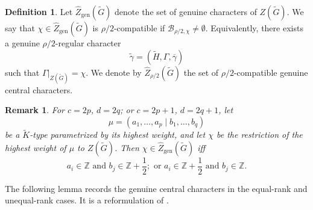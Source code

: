 \documentclass{amsart}
\newcommand{\bbZ}{{\mathbb Z}}
\newtheorem{remark}[thm]{Remark}
\theoremstyle{definition}
\newtheorem{definition}[thm]{Definition}
\newcommand{\tu}{\widetilde}
\begin{document}
\begin{definition}
Let $\widehat Z_{\mathrm{gen}}(\widetilde G)$ denote the set of genuine characters of $Z(\widetilde G)$. We say that $\chi\in \widehat Z_{\mathrm{gen}}(\widetilde G)$ is $\rho/2$-compatible if $\mathcal B_{\rho/2,\chi}\neq \emptyset$. Equivalently, there exists a genuine $\rho/2$-regular character
\begin{equation*}
\tu\gamma=(\widetilde H,\Gamma,\overline\gamma)
\end{equation*}
such that $\Gamma|_{Z(\widetilde G)}=\chi$.
We denote by $\widehat Z_{\rho/2}(\widetilde G)$ the set of $\rho/2$-compatible genuine central characters.

\end{definition}
\medskip





\begin{remark} \label{r:hw}
For $c=2p$, $d=2q$; or $c=2p+1$, $d=2q+1$, let 
$$
\mu=(a_1,\dots, a_p\mid b_1,\dots, b_q) 
$$
be a $\tu K$-type parametrized by its highest weight, and let $\chi$ be the restriction of 
the highest weight of $\mu$ to $Z(\tu G)$. Then $\chi \in  \widehat Z_{\mathrm{gen}}(\widetilde G)$ iff 
$$
a_i\in \bbZ \text{ and } b_j\in \bbZ+\frac{1}{2}; \text{ or }  
a_i\in \bbZ+\frac{1}{2} \text{ and } b_j\in \bbZ.
$$
\end{remark}



The following lemma records the genuine central characters in the
equal-rank and unequal-rank cases.  It is a reformulation of
\cite[Lemma~6.3]{BTs18}.
\end{document}
